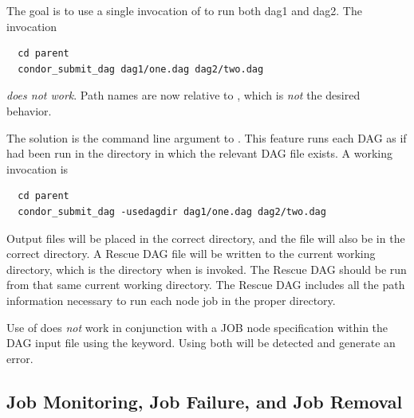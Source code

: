 The goal is to use a single invocation of 
to run both dag1 and dag2.
The invocation
\begin{verbatim}
  cd parent
  condor_submit_dag dag1/one.dag dag2/two.dag
\end{verbatim}
\emph{does not work}.
Path names are now relative to , 
which is \emph{not} the desired behavior.

The solution is 
the  command line argument to .
This feature runs each DAG as if  had been run 
in the directory in which the relevant DAG file exists.
A working invocation is
\begin{verbatim}
  cd parent
  condor_submit_dag -usedagdir dag1/one.dag dag2/two.dag
\end{verbatim}

Output files will be placed in the correct directory, and
the  file will also be in the correct directory.
A Rescue DAG file will be written to
the current working directory, which is the directory when
 is invoked.
The Rescue DAG should be run from that same current working directory.
The Rescue DAG includes all the path information necessary to
run each node job in the proper directory.



Use of  does \emph{not} work in conjunction with
a JOB node specification within the DAG input file using
the  keyword.
Using both will be detected and generate an error. 

\subsection{\label{sec:DAGMonitoring}Job Monitoring, Job Failure, and Job Removal}

